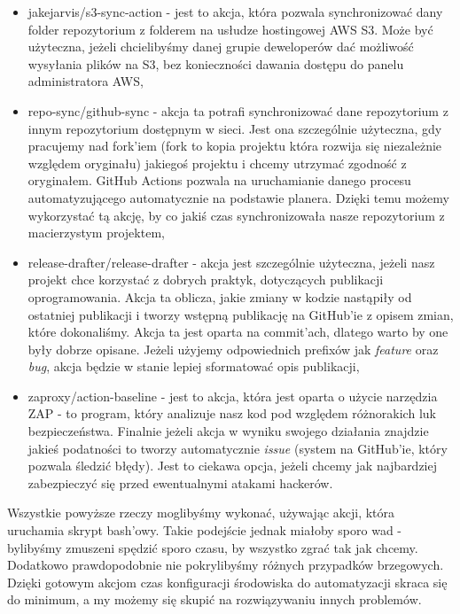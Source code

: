 \begin{itemize}
  \item jakejarvis/s3-sync-action - jest to akcja, która pozwala synchronizować dany folder repozytorium z folderem na usłudze hostingowej AWS S3. Może być użyteczna, jeżeli chcielibyśmy danej grupie deweloperów dać możliwość wysyłania plików na S3, bez konieczności dawania dostępu do panelu administratora AWS,
  \item repo-sync/github-sync - akcja ta potrafi synchronizować dane repozytorium z innym repozytorium dostępnym w sieci. Jest ona szczególnie użyteczna, gdy pracujemy nad fork'iem (fork to kopia projektu która rozwija się niezależnie względem oryginału) jakiegoś projektu i chcemy utrzymać zgodność z oryginałem. GitHub Actions pozwala na uruchamianie danego procesu automatyzującego automatycznie na podstawie planera. Dzięki temu możemy wykorzystać tą akcję, by co jakiś czas synchronizowała nasze repozytorium z macierzystym projektem,
  \item release-drafter/release-drafter - akcja jest szczególnie użyteczna, jeżeli nasz projekt chce korzystać z dobrych praktyk, dotyczących publikacji oprogramowania. Akcja ta oblicza, jakie zmiany w kodzie nastąpiły od ostatniej publikacji i tworzy wstępną publikację na GitHub'ie z opisem zmian, które dokonaliśmy. Akcja ta jest oparta na commit'ach, dlatego warto by one były dobrze opisane. Jeżeli użyjemy odpowiednich prefixów jak \textit{feature} oraz \textit{bug}, akcja będzie w stanie lepiej sformatować opis publikacji,
  \item zaproxy/action-baseline - jest to akcja, która jest oparta o użycie narzędzia ZAP - to program, który analizuje nasz kod pod względem różnorakich luk bezpieczeństwa. Finalnie jeżeli akcja w wyniku swojego działania znajdzie jakieś podatności to tworzy automatycznie \textit{issue} (system na GitHub'ie, który pozwala śledzić błędy). Jest to ciekawa opcja, jeżeli chcemy jak najbardziej zabezpieczyć się przed ewentualnymi atakami hackerów.
\end{itemize}
Wszystkie powyższe rzeczy moglibyśmy wykonać, używając akcji, która uruchamia skrypt bash'owy. Takie podejście jednak miałoby sporo wad - bylibyśmy zmuszeni spędzić sporo czasu, by wszystko zgrać tak jak chcemy. Dodatkowo prawdopodobnie nie pokrylibyśmy różnych przypadków brzegowych. Dzięki gotowym akcjom czas konfiguracji środowiska do automatyzacji skraca się do minimum, a my możemy się skupić na rozwiązywaniu innych problemów.
